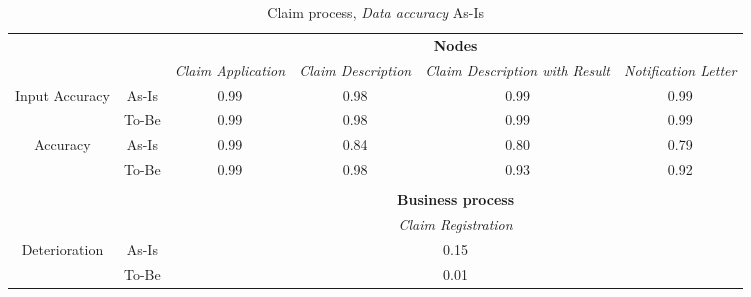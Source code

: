 \begin{center}
\begin{table}[H]
\begin{tabular}{|c|c|p{2cm}|p{2.5cm}|p{2.5cm}|p{2.5cm}|}


\cline{3-6}
\multicolumn{2}{c}{} & \multicolumn{4}{|c|}{\textbf{Nodes}} \\ \cline{3-6}
\multicolumn{2}{c|}{} & \textsl{Claim Application} & \textsl{Claim Description} & \textsl{Claim Description with Result} & \textsl{Notification Letter}\\
\hline
\multirow{2}{*}{Input Accuracy} & As-Is & \multicolumn{1}{c|}{0.99} & \multicolumn{1}{c|}{0.98} & \multicolumn{1}{c|}{0.99} & \multicolumn{1}{c|}{0.99}\\ \cline{2-6}
								& To-Be & \multicolumn{1}{c|}{0.99} & \multicolumn{1}{c|}{0.98} & \multicolumn{1}{c|}{0.99} & \multicolumn{1}{c|}{0.99}\\ \hline

\multirow{2}{*}{Accuracy} 		& As-Is & \multicolumn{1}{c|}{0.99} & \multicolumn{1}{c|}{0.84} & \multicolumn{1}{c|}{0.80} & \multicolumn{1}{c|}{0.79}\\ \cline{2-6}
								& To-Be & \multicolumn{1}{c|}{0.99} & \multicolumn{1}{c|}{0.98} & \multicolumn{1}{c|}{0.93} & \multicolumn{1}{c|}{0.92}\\ \hline

\multicolumn{6}{c}{} \\ \cline{3-6}
\multicolumn{2}{c}{} & \multicolumn{4}{|c|}{\textbf{Business process}} \\ \cline{3-6}
\multicolumn{2}{c|}{} & \multicolumn{4}{|c|}{\textsl{Claim Registration}} \\ \hline
\multirow{2}{*}{Deterioration} & As-Is & \multicolumn{4}{|c|}{0.15}\\ \cline{2-6}
							   & To-Be & \multicolumn{4}{|c|}{0.01}\\ \hline
\end{tabular}
\caption{Claim process, \textsl{Data accuracy} As-Is}
\label{tab:claim_as_is}
\end{table}
\end{center}